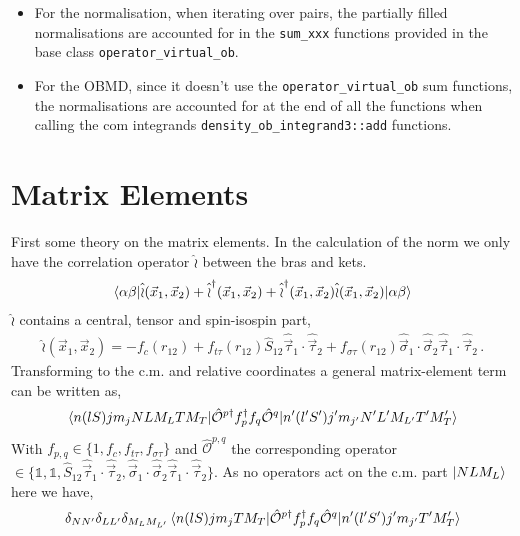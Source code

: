 \documentclass[10pt]{article}
\begin{document}
\begin{itemize}
\item For the normalisation, when iterating over pairs, the partially filled 
normalisations are accounted for in the \texttt{sum\_xxx} functions provided in 
the base class \texttt{operator\_virtual\_ob}.
\item For the OBMD, since it doesn't use the  \texttt{operator\_virtual\_ob} 
sum functions, the normalisations are accounted for at the end of all the 
 functions when calling the com integrands 
\texttt{density\_ob\_integrand3::add} functions.
\end{itemize}



\section{Matrix Elements}
First some theory on the matrix elements. In the calculation of the norm we only have the correlation operator $\hat{\wr}$ between the bras and kets.
\begin{align}\label{eq:norm}
	\braket{ \alpha \beta |\hat{\wr}(\vec{x}_{1},\vec{x}_{2}) + \hat{\wr}^{\dagger}(\vec{x}_{1},\vec{x}_{2}) + \hat{\wr}^{\dagger}(\vec{x}_{1},\vec{x}_{2})\hat{\wr}(\vec{x}_{1},\vec{x}_{2}) | \alpha \beta}
\end{align}
$\hat{\wr}$ contains a central, tensor and spin-isospin part,
\begin{align*}
	\hat{\wr}(\vec{x}_{1},\vec{x}_{2}) = -f_c(r_{12}) + f_{t\tau}(r_{12}) \hat{S}_{12} \hat{\vec{\tau}}_{1} \cdot \hat{\vec{\tau}}_{2} + f_{\sigma \tau}(r_{12}) \hat{ \vec{\sigma}}_{1} \cdot \hat{ \vec{\sigma}}_{2} \hat{ \vec{\tau}}_{1} \cdot \hat{ \vec{\tau}}_{2}  \, .
\end{align*}
Transforming to the c.m. and relative coordinates a general matrix-element term can be written as,
\begin{align*}
	\braket{ n (l S) j m_j N L M_L T M_T |  \hat{\mathcal{O}}^{p\dagger} 
f^{\dagger}_{p} f_{q} \hat{\mathcal{O}}^{q} | n' (l' S') j' m_{j'} N' L' M_{L'} 
T' M_T'} 
\end{align*}
With $f_{p,q} \in \{ 1, f_{c}, f_{t\tau}, f_{\sigma \tau} \}$ and 
$\hat{\mathcal{O}}^{p,q}$ the corresponding operator $\in \{ \mathbb{1}, 
\mathbb{1},  \hat{S}_{12} \hat{\vec{\tau}}_{1} \cdot \hat{\vec{\tau}}_{2}, 
\hat{ \vec{\sigma}}_{1} \cdot \hat{ \vec{\sigma}}_{2} \hat{ \vec{\tau}}_{1} 
\cdot \hat{ \vec{\tau}}_{2} \} $.
As no operators act on the c.m. part $ \ket{ N L M_L}$ here we have,
\begin{align*}
	\delta_{NN'} \delta_{LL'} \delta_{M_L M_{L'}} \braket{ n (l S) j m_j T 
M_T |  \hat{\mathcal{O}}^{p\dagger} f^{\dagger}_{p} f_{q} \hat{\mathcal{O}}^{q} 
| n' (l' S') j' m_{j'} T' M_T'}  
\end{align*}
\end{document}

